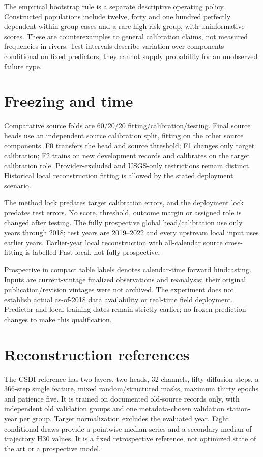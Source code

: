 \documentclass[draft]{agujournal2025}
\begin{document}
The empirical bootstrap rule is a separate descriptive operating policy. Constructed populations include twelve, forty and one hundred perfectly dependent-within-group cases and a rare high-risk group, with uninformative scores. These are counterexamples to general calibration claims, not measured frequencies in rivers. Test intervals describe variation over components conditional on fixed predictors; they cannot supply probability for an unobserved failure type.

\section{Freezing and time}
Comparative source folds are 60/20/20 fitting/calibration/testing. Final source heads use an independent source calibration split, fitting on the other source components. F0 transfers the head and source threshold; F1 changes only target calibration; F2 trains on new development records and calibrates on the target calibration role. Provider-excluded and USGS-only restrictions remain distinct. Historical local reconstruction fitting is allowed by the stated deployment scenario.

The method lock predates target calibration errors, and the deployment lock predates test errors. No score, threshold, outcome margin or assigned role is changed after testing. The fully prospective global head/calibration use only years through 2018; test years are 2019--2022 and every upstream local input uses earlier years. Earlier-year local reconstruction with all-calendar source cross-fitting is labelled Past-local, not fully prospective.

Prospective in compact table labels denotes calendar-time forward hindcasting. Inputs are current-vintage finalized observations and reanalysis; their original publication/revision vintages were not archived. The experiment does not establish actual as-of-2018 data availability or real-time field deployment. Predictor and local training dates remain strictly earlier; no frozen prediction changes to make this qualification.

\section{Reconstruction references}
The CSDI reference has two layers, two heads, 32 channels, fifty diffusion steps, a 366-step single feature, mixed random/structured masks, maximum thirty epochs and patience five. It is trained on documented old-source records only, with independent old validation groups and one metadata-chosen validation station-year per group. Target normalization excludes the evaluated year. Eight conditional draws provide a pointwise median series and a secondary median of trajectory H30 values. It is a fixed retrospective reference, not optimized state of the art or a prospective model.
\end{document}
